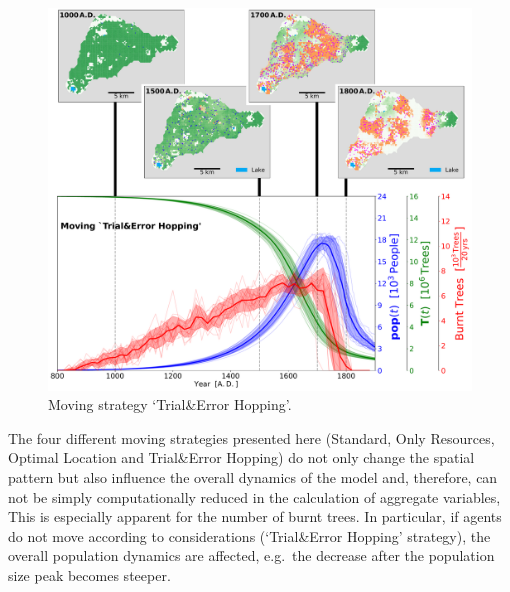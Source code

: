 \begin{figure}
	\centering
	\includegraphics[width=1\textwidth]{images/Results/Moving/alphaHopping_EnsembleStatistics+Panels}
	\caption{Moving strategy `Trial\&Error Hopping'.}
	\label{fig:hop}
\end{figure}
The four different moving strategies presented here (Standard, Only Resources, Optimal Location and Trial\&Error Hopping) do not only change the spatial pattern but also influence the overall dynamics of the model and, therefore, can not be simply computationally reduced in the calculation of aggregate variables,
This is especially apparent for the number of burnt trees.
In particular, if agents do not move according to considerations (`Trial\&Error Hopping' strategy), the overall population dynamics are affected, e.g.\ the decrease after the population size peak becomes steeper.



